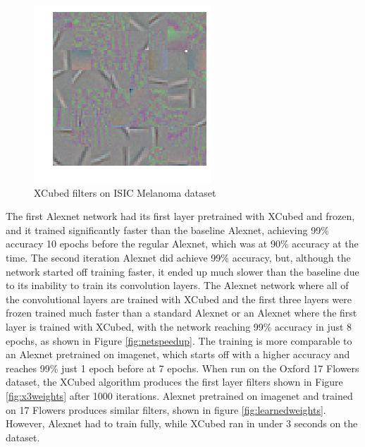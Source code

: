 \documentclass[twocolumn]{article}
\begin{document}
\begin{figure}[ht]
    \centering
    \includegraphics[width=.8\linewidth]{melafet}
    \caption{XCubed filters on ISIC Melanoma dataset}
    \label{fig:melanoma}
\end{figure}
The first Alexnet network had its first layer pretrained with XCubed and frozen, and it trained significantly faster than the baseline Alexnet, achieving 99\% accuracy 10 epochs before the regular Alexnet, which was at 90\% accuracy at the time. The second iteration Alexnet did achieve 99\% accuracy, but, although the network started off training faster, it ended up much slower than the baseline due to its inability to train its convolution layers. The Alexnet network where all of the convolutional layers are trained with XCubed and the first three layers were frozen trained much faster than a standard Alexnet or an Alexnet where the first layer is trained with XCubed, with the network reaching 99\% accuracy in just 8 epochs, as shown in Figure \ref{fig:netspeedup}. The training is more comparable to an Alexnet pretrained on imagenet, which starts off with a higher accuracy and reaches 99\% just 1 epoch before at 7 epochs. When run on the Oxford 17 Flowers dataset, the XCubed algorithm produces the first layer filters shown in Figure \ref{fig:x3weights} after 1000 iterations. Alexnet pretrained on imagenet and trained on 17 Flowers produces similar filters, shown in figure \ref{fig:learnedweights}. However, Alexnet had to train fully, while XCubed ran in under 3 seconds on the dataset.
\end{document}
